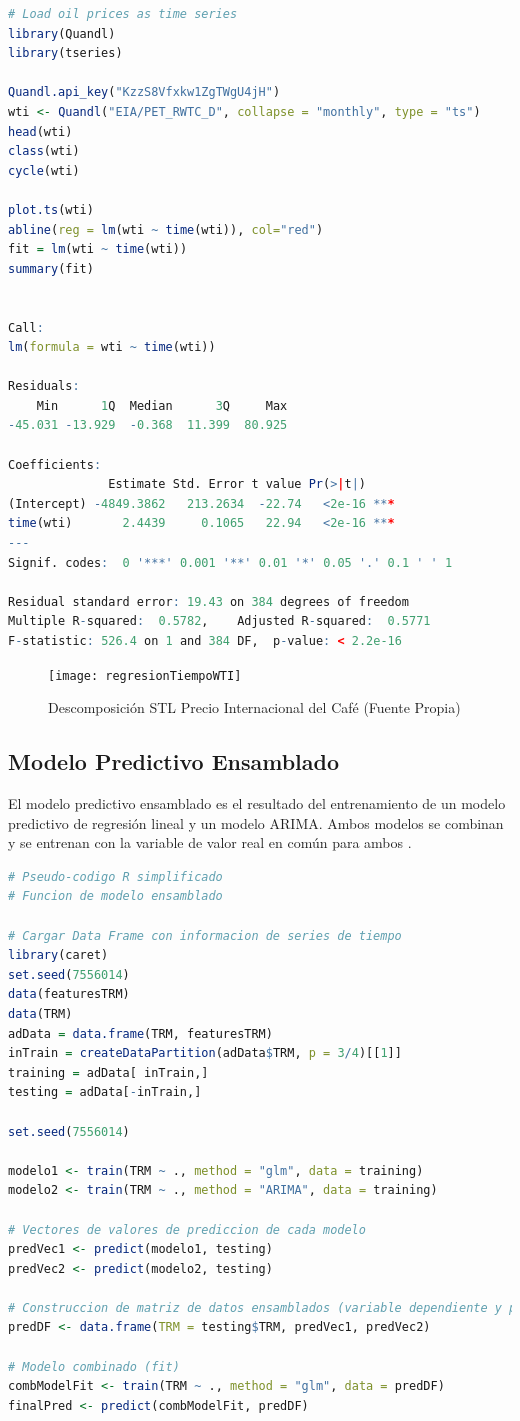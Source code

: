 \begin{lstlisting}[language=R]
# Load oil prices as time series
library(Quandl)
library(tseries)

Quandl.api_key("KzzS8Vfxkw1ZgTWgU4jH")
wti <- Quandl("EIA/PET_RWTC_D", collapse = "monthly", type = "ts")
head(wti)
class(wti)
cycle(wti)

plot.ts(wti)
abline(reg = lm(wti ~ time(wti)), col="red")
fit = lm(wti ~ time(wti))
summary(fit)


Call:
lm(formula = wti ~ time(wti))

Residuals:
    Min      1Q  Median      3Q     Max 
-45.031 -13.929  -0.368  11.399  80.925 

Coefficients:
              Estimate Std. Error t value Pr(>|t|)    
(Intercept) -4849.3862   213.2634  -22.74   <2e-16 ***
time(wti)       2.4439     0.1065   22.94   <2e-16 ***
---
Signif. codes:  0 '***' 0.001 '**' 0.01 '*' 0.05 '.' 0.1 ' ' 1

Residual standard error: 19.43 on 384 degrees of freedom
Multiple R-squared:  0.5782,	Adjusted R-squared:  0.5771 
F-statistic: 526.4 on 1 and 384 DF,  p-value: < 2.2e-16
\end{lstlisting}

\begin{figure}[H]
	\centering
	\texttt{[image: regresionTiempoWTI]}\\
	\caption{Descomposición STL Precio Internacional del Café (Fuente Propia)}
\end{figure}

\subsection{Modelo Predictivo Ensamblado} 
El modelo predictivo ensamblado es el resultado del entrenamiento de un modelo predictivo de regresión lineal y un modelo ARIMA. Ambos modelos se combinan y se entrenan con la variable de valor real en común para ambos \cite{viswanathan}.

\begin{lstlisting}[language=R]
# Pseudo-codigo R simplificado
# Funcion de modelo ensamblado

# Cargar Data Frame con informacion de series de tiempo
library(caret)
set.seed(7556014)
data(featuresTRM)
data(TRM)
adData = data.frame(TRM, featuresTRM)
inTrain = createDataPartition(adData$TRM, p = 3/4)[[1]]
training = adData[ inTrain,]
testing = adData[-inTrain,]

set.seed(7556014)

modelo1 <- train(TRM ~ ., method = "glm", data = training)
modelo2 <- train(TRM ~ ., method = "ARIMA", data = training)

# Vectores de valores de prediccion de cada modelo
predVec1 <- predict(modelo1, testing)
predVec2 <- predict(modelo2, testing)

# Construccion de matriz de datos ensamblados (variable dependiente y predictor)
predDF <- data.frame(TRM = testing$TRM, predVec1, predVec2)

# Modelo combinado (fit)
combModelFit <- train(TRM ~ ., method = "glm", data = predDF)
finalPred <- predict(combModelFit, predDF) 
\end{lstlisting}

